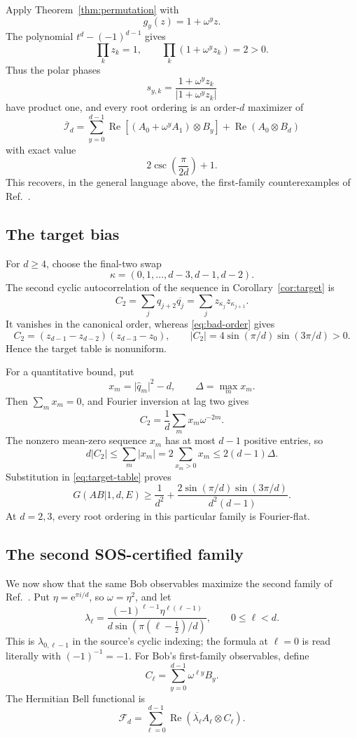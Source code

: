 \documentclass[11pt]{article}
\theoremstyle{remark}
\newcommand{\cI}{\mathcal I}
\newcommand{\cF}{\mathcal F}
\newcommand{\e}{\mathrm e}
\newcommand{\Reop}{\operatorname{Re}}
\newcommand{\absop}[1]{\lvert #1\rvert}
\begin{document}
Apply Theorem~\ref{thm:permutation} with
\[
g_y(z)=1+\omega^yz.
\]
The polynomial \(t^d-(-1)^{d-1}\) gives
\[
\prod_kz_k=1,\qquad
\prod_k(1+\omega^yz_k)=2>0.
\]
Thus the polar phases
\[
s_{y,k}=\frac{1+\omega^yz_k}{\absop{1+\omega^yz_k}}
\]
have product one, and every root ordering is an order-\(d\) maximizer of
\[
\overline{\cI}_d
=
\sum_{y=0}^{d-1}
\Reop\!\left[(A_0+\omega^yA_1)\otimes B_y\right]
+\Reop(A_0\otimes B_d)
\]
with exact value
\[
2\csc\!\left(\frac{\pi}{2d}\right)+1.
\]
This recovers, in the general language above, the first-family
counterexamples of Ref.~\cite{KriebelCounterexample2026}.

\subsection{The target bias}

For \(d\geq4\), choose the final-two swap
\begin{equation}
\kappa=(0,1,\ldots,d-3,d-1,d-2).
\label{eq:bad-order}
\end{equation}
The second cyclic autocorrelation of the sequence in
Corollary~\ref{cor:target} is
\[
C_2=\sum_jq_{j+2}\overline{q_j}
=\sum_jz_{\kappa_j}z_{\kappa_{j+1}}.
\]
It vanishes in the canonical order, whereas \eqref{eq:bad-order} gives
\begin{equation}
C_2=(z_{d-1}-z_{d-2})(z_{d-3}-z_0),
\qquad
\absop{C_2}
=4\sin(\pi/d)\sin(3\pi/d)>0.
\label{eq:C2}
\end{equation}
Hence the target table is nonuniform.

For a quantitative bound, put
\[
x_m=\absop{\widehat q_m}^2-d,\qquad
\Delta=\max_mx_m.
\]
Then \(\sum_mx_m=0\), and Fourier inversion at lag two gives
\[
C_2=\frac1d\sum_mx_m\omega^{-2m}.
\]
The nonzero mean-zero sequence \(x_m\) has at most \(d-1\) positive entries,
so
\[
d\absop{C_2}\leq\sum_m\absop{x_m}
=2\sum_{x_m>0}x_m\leq2(d-1)\Delta.
\]
Substitution in \eqref{eq:target-table} proves
\begin{equation}
G(AB|1,d,E)
\geq
\frac1{d^2}
+
\frac{2\sin(\pi/d)\sin(3\pi/d)}{d^2(d-1)}.
\label{eq:gap}
\end{equation}
At \(d=2,3\), every root ordering in this particular family is
Fourier-flat.

\subsection{The second SOS-certified family}

We now show that the same Bob observables maximize the second family of
Ref.~\cite{PeritoEtAl2026}.  Put
\(\eta=\e^{\pi i/d}\), so \(\omega=\eta^2\), and let
\[
\lambda_\ell
=
\frac{(-1)^{\ell-1}\eta^{\ell(\ell-1)}}
{d\sin(\pi(\ell-\tfrac12)/d)},
\qquad 0\leq\ell<d.
\label{eq:lambda}
\]
This is \(\lambda_{0,\ell-1}\) in the source's cyclic indexing; the formula
at \(\ell=0\) is read literally with \((-1)^{-1}=-1\).
For Bob's first-family observables, define
\[
C_\ell=\sum_{y=0}^{d-1}\omega^{\ell y}B_y.
\]
The Hermitian Bell functional is
\begin{equation}
\cF_d
=
\sum_{\ell=0}^{d-1}
\Reop\!\left(
\overline{\lambda_\ell}A_\ell\otimes C_\ell
\right).
\label{eq:second-functional}
\end{equation}
\end{document}
